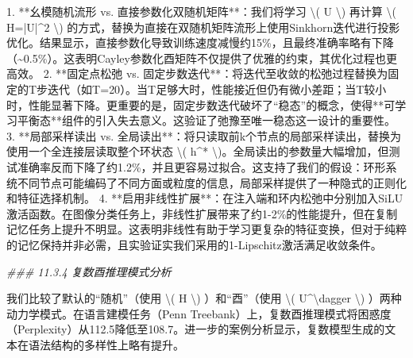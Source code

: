 \documentclass[
  12pt,
]{article}
\newenvironment{Shaded}{}{}
\newcommand{\CommentTok}[1]{\textcolor[rgb]{0.38,0.63,0.69}{\textit{#1}}}
\newcommand{\DecValTok}[1]{\textcolor[rgb]{0.25,0.63,0.44}{#1}}
\newcommand{\FloatTok}[1]{\textcolor[rgb]{0.25,0.63,0.44}{#1}}
\newcommand{\NormalTok}[1]{#1}
\newcommand{\OperatorTok}[1]{\textcolor[rgb]{0.40,0.40,0.40}{#1}}
\begin{document}
\begin{Shaded}
\begin{Highlighting}[]
\FloatTok{1.}  \OperatorTok{**}\NormalTok{幺模随机流形 vs. 直接参数化双随机矩阵}\OperatorTok{**}\NormalTok{：我们将学习 }\OperatorTok{\textbackslash{}}\NormalTok{( U }\OperatorTok{\textbackslash{}}\NormalTok{) 再计算 }\OperatorTok{\textbackslash{}}\NormalTok{( H}\OperatorTok{=|}\NormalTok{U}\OperatorTok{|\^{}}\DecValTok{2} \OperatorTok{\textbackslash{}}\NormalTok{) 的方式，替换为直接在双随机矩阵流形上使用Sinkhorn迭代进行投影优化。结果显示，直接参数化导致训练速度减慢约}\DecValTok{15}\OperatorTok{\%}\NormalTok{，且最终准确率略有下降（}\OperatorTok{\textasciitilde{}}\FloatTok{0.5}\OperatorTok{\%}\NormalTok{）。这表明Cayley参数化酉矩阵不仅提供了优雅的约束，其优化过程也更高效。}
\FloatTok{2.}  \OperatorTok{**}\NormalTok{固定点松弛 vs. 固定步数迭代}\OperatorTok{**}\NormalTok{：将迭代至收敛的松弛过程替换为固定的T步迭代（如T}\OperatorTok{=}\DecValTok{20}\NormalTok{）。当T足够大时，性能接近但仍有微小差距；当T较小时，性能显著下降。更重要的是，固定步数迭代破坏了“稳态”的概念，使得}\OperatorTok{**}\NormalTok{可学习平衡态}\OperatorTok{**}\NormalTok{组件的引入失去意义。这验证了弛豫至唯一稳态这一设计的重要性。}
\FloatTok{3.}  \OperatorTok{**}\NormalTok{局部采样读出 vs. 全局读出}\OperatorTok{**}\NormalTok{：将只读取前k个节点的局部采样读出，替换为使用一个全连接层读取整个环状态 }\OperatorTok{\textbackslash{}}\NormalTok{( h}\OperatorTok{\^{}*} \OperatorTok{\textbackslash{}}\NormalTok{)。全局读出的参数量大幅增加，但测试准确率反而下降了约}\FloatTok{1.2}\OperatorTok{\%}\NormalTok{，并且更容易过拟合。这支持了我们的假设：环形系统不同节点可能编码了不同方面或粒度的信息，局部采样提供了一种隐式的正则化和特征选择机制。}
\FloatTok{4.}  \OperatorTok{**}\NormalTok{启用非线性扩展}\OperatorTok{**}\NormalTok{：在注入端和环内松弛中分别加入SiLU激活函数。在图像分类任务上，非线性扩展带来了约}\DecValTok{1}\OperatorTok{{-}}\DecValTok{2}\OperatorTok{\%}\NormalTok{的性能提升，但在复制记忆任务上提升不明显。这表明非线性有助于学习更复杂的特征变换，但对于纯粹的记忆保持并非必需，且实验证实我们采用的}\DecValTok{1}\OperatorTok{{-}}\NormalTok{Lipschitz激活满足收敛条件。}

\CommentTok{\#\#\# 11.3.4 复数酉推理模式分析}

\NormalTok{我们比较了默认的“随机”（使用 }\OperatorTok{\textbackslash{}}\NormalTok{( H }\OperatorTok{\textbackslash{}}\NormalTok{) ）和“酉”（使用 }\OperatorTok{\textbackslash{}}\NormalTok{( U}\OperatorTok{\^{}\textbackslash{}}\NormalTok{dagger }\OperatorTok{\textbackslash{}}\NormalTok{) ）两种动力学模式。在语言建模任务（Penn Treebank）上，复数酉推理模式将困惑度（Perplexity）从}\FloatTok{112.5}\NormalTok{降低至}\FloatTok{108.7}\NormalTok{。进一步的案例分析显示，复数模型生成的文本在语法结构的多样性上略有提升。}


\end{Highlighting}
\end{Shaded}
\end{document}
